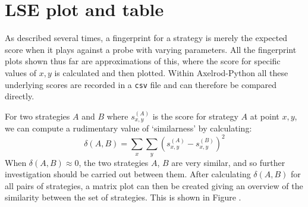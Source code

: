 
\section{LSE plot and table}\label{sec:lse}
As described several times, a fingerprint for a strategy is merely the expected score when it plays against a probe with varying parameters.
All the fingerprint plots shown thus far are approximations of this, where the score for specific values of $x, y$ is calculated and then plotted.
Within Axelrod-Python all these underlying scores are recorded in a \texttt{csv} file and can therefore be compared directly.

For two strategies $A$ and $B$ where $s_{x, y}^{(A)}$ is the score for strategy $A$ at point $x, y$, we can compute a rudimentary value of `similarness' by calculating:
$$
\delta(A, B) = \sum_x \sum_y (s_{x, y}^{(A)} - s_{x, y}^{(B)})^2
$$
When $\delta(A, B) \approx 0$, the two strategies $A$, $B$ are very similar, and so further investigation should be carried out between them.
After calculating $\delta(A, B)$ for all pairs of strategies, a matrix plot can then be created giving an overview of the similarity between the set of strategies.
This is shown in Figure .%

